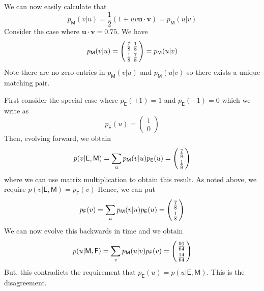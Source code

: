 \documentclass[10pt]{article}
\begin{document}
We can now easily calculate that
\begin{equation}
p_\mathsf{M}(v|u) = \frac{1}{2}\left(1+uv\mathbf{u}\cdot \mathbf{v}\right) = p_\mathsf{M}(u|v)
\end{equation}
Consider the case where $\mathbf{u}\cdot \mathbf{v}=0.75$.  We have
\begin{equation} \arraycolsep=1.4pt\def\arraystretch{1.3}
p_\mathsf{M}(v|u) = \left( \begin{array}{cc}
                             \frac{7}{8} & \frac{1}{8} \\
                             \frac{1}{8} & \frac{7}{8}
                           \end{array}  \right)
                           = p_\mathsf{M}(u|v)
\end{equation}
Note there are no zero entries in $p_\mathsf{M}(v|u)$ and $p_\mathsf{M}(u|v)$ so there exists a unique matching pair.

First consider the special case where $p_\mathsf{E}(+1)=1$ and $p_\mathsf{E}(-1)=0$ which we write as
\begin{equation}\label{pEuexample}
p_\mathsf{E}(u) =  \left(\begin{array}{c}
                            1 \\
                            0
                          \end{array}  \right)
\end{equation}
Then, evolving forward, we obtain
\begin{equation} \arraycolsep=1.4pt\def\arraystretch{1.3}
p(v|\mathsf{E,M}) =\sum_u p_\mathsf{M}(v|u) p_\mathsf{E}(u) =\left(\begin{array}{c}
                            \frac{7}{8} \\
                            \frac{1}{8}
                          \end{array}  \right)
\end{equation}
where we can use matrix multiplication to obtain this result.  As noted above, we require $p(v|\mathsf{E,M}) = p_\mathsf{F}(v)$
Hence, we can put
\begin{equation} \arraycolsep=1.4pt\def\arraystretch{1.3}
p_\mathsf{F}(v) =\sum_u p_\mathsf{M}(v|u) p_\mathsf{E}(u) =\left(\begin{array}{c}
                            \frac{7}{8} \\
                            \frac{1}{8}
                          \end{array}  \right)
\end{equation}
We can now evolve this backwards in time and we obtain
\begin{equation} \arraycolsep=1.4pt\def\arraystretch{1.3}
p(u|\mathsf{M,F}) =\sum_v p_\mathsf{M}(u|v) p_\mathsf{F}(v) =\left(\begin{array}{c}
                            \frac{50}{64} \\
                            \frac{14}{64}
                          \end{array}  \right)
\end{equation}
But, this contradicts the requirement that $p_\mathsf{E}(u)=p(u|\mathsf{E,M})$.  This is the disagreement.
\end{document}
